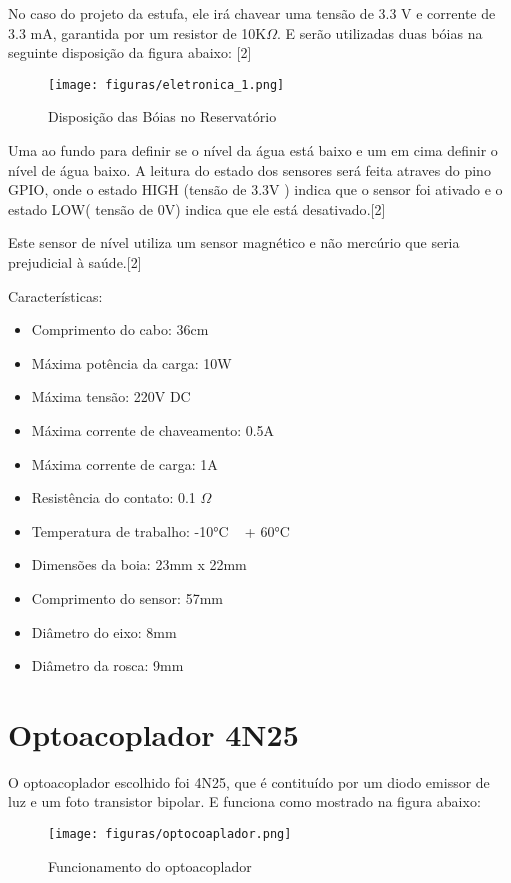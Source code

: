 No caso do projeto da estufa, ele irá chavear uma tensão de 3.3 V e corrente de 3.3 mA, garantida por um resistor de 10K$\Omega$. E serão utilizadas duas bóias na seguinte disposição da figura abaixo:\cite{eicos} [2]

\begin{figure}[H]
	\centering
	\texttt{[image: figuras/eletronica\_1.png]}
	\caption{Disposição das Bóias no Reservatório} \label{eletronica_1}
\end{figure}

Uma ao fundo para definir se o nível da água está baixo e um em cima definir o nível de água baixo.  A leitura do estado dos sensores será feita atraves do pino GPIO, onde o estado HIGH (tensão de 3.3V ) indica que o sensor foi ativado e o estado LOW( tensão de 0V) indica que ele está desativado\cite{eicos}.[2]

Este sensor de nível utiliza um sensor magnético e não mercúrio que seria prejudicial à saúde\cite{eicos}.[2]

Características:

\begin{itemize}
	\item Comprimento do cabo: 36cm
	\item Máxima potência da carga: 10W
	\item Máxima tensão: 220V DC
	\item Máxima corrente de chaveamento: 0.5A
	\item Máxima corrente de carga: 1A
	\item Resistência do contato: 0.1 $\Omega$
	\item Temperatura de trabalho: -10°C ~ + 60°C
	\item Dimensões da boia: 23mm x 22mm
	\item Comprimento do sensor: 57mm
	\item Diâmetro do eixo: 8mm
	\item Diâmetro da rosca: 9mm
\end{itemize}

\section{Optoacoplador 4N25}

O optoacoplador escolhido foi 4N25, que é contituído por um diodo emissor de luz e um foto transistor bipolar. E funciona como mostrado na figura abaixo:

\begin{figure}[H]
	\centering
	\texttt{[image: figuras/optocoaplador.png]}
	\caption{Funcionamento do optoacoplador} \label{optocoaplador}
\end{figure}

